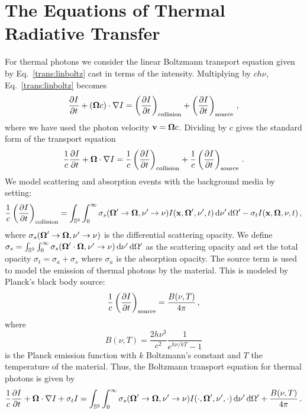 \documentclass[../doc.tex]{subfiles}
\begin{document}
\section{The Equations of Thermal Radiative Transfer}
For thermal photons we consider the linear Boltzmann transport equation given by Eq.~\ref{trans:linboltz} cast in terms of the intensity. Multiplying by $c h\nu $, Eq.~\ref{trans:linboltz} becomes 
	\begin{equation}
		\frac{\partial I}{\partial t} + (\boldsymbol{\Omega} c) \cdot \nabla I = \left( \frac{\partial I}{\partial t} \right)_\text{collision} + \left( \frac{\partial I}{\partial t} \right)_\text{source} \,, 
	\end{equation}
where we have used the photon velocity $\boldsymbol{\mathrm{v}} = \boldsymbol{\Omega} c$. Dividing by $c$ gives the standard form of the transport equation 
	\begin{equation}
		\frac{1}{c}\frac{\partial I}{\partial t} + \boldsymbol{\Omega}\cdot \nabla I = \frac{1}{c} \left( \frac{\partial I}{\partial t} \right)_\text{collision} + \frac{1}{c}\left( \frac{\partial I}{\partial t} \right)_\text{source} \,. 
	\end{equation}
We model scattering and absorption events with the background media by setting: 
	\begin{equation}
		\frac{1}{c}\left( \frac{\partial I}{\partial t} \right)_\text{collision} = \int_{\mathbb{S}^2} \int_0^\infty \sigma_s(\boldsymbol{\Omega}'\rightarrow \boldsymbol{\Omega}, \nu' \rightarrow \nu) I(\boldsymbol{\mathrm{x}},\boldsymbol{\Omega}',\nu',t) \mathop{}\!\mathrm{d} \nu' \mathop{}\!\mathrm{d} \Omega' - \sigma_t I(\boldsymbol{\mathrm{x}},\boldsymbol{\Omega},\nu,t) \,,
	\end{equation}
where $\sigma_s(\boldsymbol{\Omega}'\rightarrow\boldsymbol{\Omega},\nu'\rightarrow \nu)$ is the differential scattering opacity. We define $\sigma_s = \int_{\mathbb{S}^2} \int_0^\infty \sigma_s(\boldsymbol{\Omega}'\cdot\boldsymbol{\Omega},\nu'\rightarrow\nu) \mathop{}\!\mathrm{d} \nu'\mathop{}\!\mathrm{d}\Omega'$ as the scattering opacity and set the total opacity $\sigma_t = \sigma_a + \sigma_s$ where $\sigma_a$ is the absorption opacity. The source term is used to model the emission of thermal photons by the material. This is modeled by Planck's black body source: 
	\begin{equation}
		\frac{1}{c}\left( \frac{\partial I}{\partial t} \right)_\text{source} = \frac{B(\nu,T)}{4\pi} \,,
	\end{equation}
where
	\begin{equation}
		B(\nu,T) = \frac{2h\nu^3}{c^2}\frac{1}{e^{h\nu/kT}-1}
	\end{equation}
is the Planck emission function with $k$ Boltzmann's constant and $T$ the temperature of the material. 
Thus, the Boltzmann transport equation for thermal photons is given by 
	\begin{equation} \label{trans:trans_photon}
		\frac{1}{c}\frac{\partial I}{\partial t} + \boldsymbol{\Omega}\cdot\nabla I + \sigma_t I = \int_{\mathbb{S}^2}\int_0^\infty \sigma_s(\boldsymbol{\Omega}'\rightarrow\boldsymbol{\Omega},\nu'\rightarrow \nu) I(\cdot,\boldsymbol{\Omega}',\nu',\cdot) \mathop{}\!\mathrm{d} \nu'\mathop{}\!\mathrm{d}\Omega' + \frac{B(\nu,T)}{4\pi} \,. 
	\end{equation}
\end{document}

